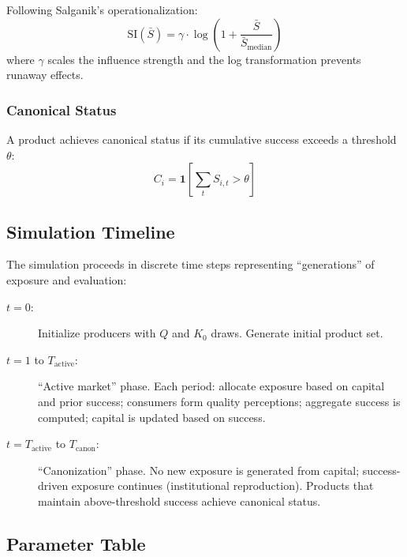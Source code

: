 \documentclass[11pt,a4paper]{article}
\begin{document}
Following Salganik's operationalization:
\begin{equation}
\text{SI}(\bar{S}) = \gamma \cdot \log\left(1 + \frac{\bar{S}}{\bar{S}_{\text{median}}}\right)
\label{eq:si}
\end{equation}
where $\gamma$ scales the influence strength and the log transformation prevents runaway effects.

\subsubsection{Canonical Status}

A product achieves canonical status if its cumulative success exceeds a threshold $\theta$:
\begin{equation}
C_i = \mathbf{1}\left[\sum_t S_{i,t} > \theta\right]
\label{eq:canon}
\end{equation}

\subsection{Simulation Timeline}

The simulation proceeds in discrete time steps representing ``generations'' of exposure and evaluation:

\begin{description}
    \item[$t = 0$:] Initialize producers with $Q$ and $K_0$ draws. Generate initial product set.
    
    \item[$t = 1$ to $T_{\text{active}}$:] ``Active market'' phase. Each period: allocate exposure based on capital and prior success; consumers form quality perceptions; aggregate success is computed; capital is updated based on success.
    
    \item[$t = T_{\text{active}}$ to $T_{\text{canon}}$:] ``Canonization'' phase. No new exposure is generated from capital; success-driven exposure continues (institutional reproduction). Products that maintain above-threshold success achieve canonical status.
\end{description}

\subsection{Parameter Table}
\end{document}
